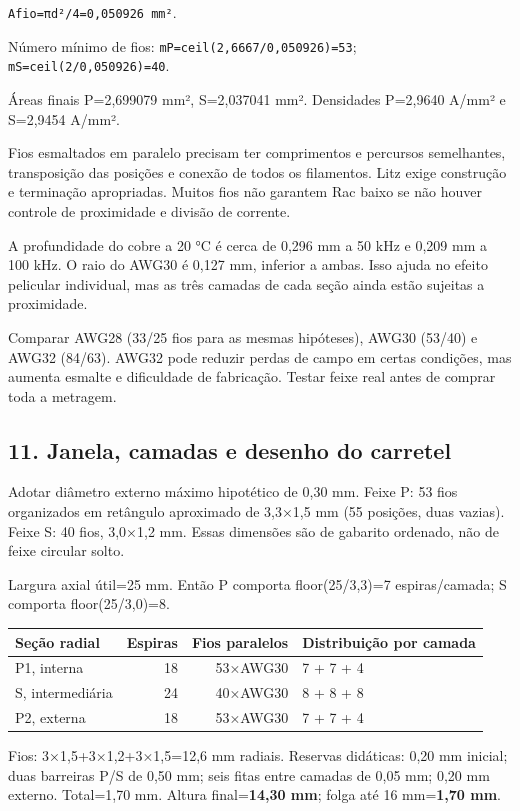 \documentclass[
]{article}
\begin{document}
\texttt{Afio=πd²/4=0,050926\ mm²}.

Número mínimo de fios: \texttt{mP=ceil(2,6667/0,050926)=53};
\texttt{mS=ceil(2/0,050926)=40}.

Áreas finais P=2,699079 mm², S=2,037041 mm². Densidades P=2,9640 A/mm² e
S=2,9454 A/mm².

Fios esmaltados em paralelo precisam ter comprimentos e percursos
semelhantes, transposição das posições e conexão de todos os filamentos.
Litz exige construção e terminação apropriadas. Muitos fios não garantem
Rac baixo se não houver controle de proximidade e divisão de corrente.

A profundidade do cobre a 20 °C é cerca de 0,296 mm a 50 kHz e 0,209 mm
a 100 kHz. O raio do AWG30 é 0,127 mm, inferior a ambas. Isso ajuda no
efeito pelicular individual, mas as três camadas de cada seção ainda
estão sujeitas a proximidade.

Comparar AWG28 (33/25 fios para as mesmas hipóteses), AWG30 (53/40) e
AWG32 (84/63). AWG32 pode reduzir perdas de campo em certas condições,
mas aumenta esmalte e dificuldade de fabricação. Testar feixe real antes
de comprar toda a metragem.

\subsection{11. Janela, camadas e desenho do
carretel}\label{janela-camadas-e-desenho-do-carretel}

Adotar diâmetro externo máximo hipotético de 0,30 mm. Feixe P: 53 fios
organizados em retângulo aproximado de 3,3×1,5 mm (55 posições, duas
vazias). Feixe S: 40 fios, 3,0×1,2 mm. Essas dimensões são de gabarito
ordenado, não de feixe circular solto.

Largura axial útil=25 mm. Então P comporta floor(25/3,3)=7
espiras/camada; S comporta floor(25/3,0)=8.

\begin{longtable}[]{@{}lrrl@{}}
\toprule\noalign{}
Seção radial & Espiras & Fios paralelos & Distribuição por camada \\
\midrule\noalign{}
\endhead
\bottomrule\noalign{}
\endlastfoot
P1, interna & 18 & 53×AWG30 & 7 + 7 + 4 \\
S, intermediária & 24 & 40×AWG30 & 8 + 8 + 8 \\
P2, externa & 18 & 53×AWG30 & 7 + 7 + 4 \\
\end{longtable}

Fios: 3×1,5+3×1,2+3×1,5=12,6 mm radiais. Reservas didáticas: 0,20 mm
inicial; duas barreiras P/S de 0,50 mm; seis fitas entre camadas de 0,05
mm; 0,20 mm externo. Total=1,70 mm. Altura final=\textbf{14,30 mm};
folga até 16 mm=\textbf{1,70 mm}.
\end{document}

